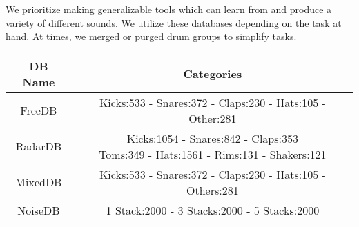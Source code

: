 \documentclass[\main/thesis.tex]{subfiles}
\begin{document}
We prioritize making generalizable tools which can learn from and produce a variety of different sounds. We utilize these databases depending on the task at hand. At times, we merged or purged drum groups to simplify tasks.

\begin{table}[]
\begin{tabular}{ |c|c| } 
\hline
DB Name & Categories \\ \hline
FreeDB  & Kicks:533 - Snares:372 - Claps:230 - Hats:105 - Other:281            \\ \hline
RadarDB & \makecell{Kicks:1054 - Snares:842 - Claps:353 \\ Toms:349 - Hats:1561 - Rims:131 - Shakers:121} \\ \hline
MixedDB & Kicks:533 - Snares:372 - Claps:230 - Hats:105 - Others:281                     \\ \hline
NoiseDB & 1 Stack:2000 - 3 Stacks:2000 - 5 Stacks:2000                         \\ \hline
\end{tabular}
    \label{table:all_db}
\end{table}


\end{document}
